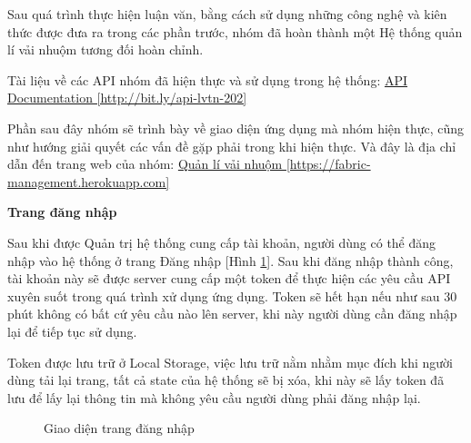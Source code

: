 Sau quá trình thực hiện luận văn, bằng cách sử dụng những công nghệ và kiên thức được đưa ra trong các phần trước, nhóm đã hoàn thành một Hệ thống quản lí vải nhuộm tương đối hoàn chỉnh.\par

Tài liệu về các API nhóm đã hiện thực và sử dụng trong hệ thống: \href{http://bit.ly/api-lvtn-202}{API Documentation [http://bit.ly/api-lvtn-202]}

Phần sau đây nhóm sẽ trình bày về giao diện ứng dụng mà nhóm hiện thực, cũng như hướng giải quyết các vấn đề gặp phải trong khi hiện thực. Và đây là địa chỉ dẫn đến trang web của nhóm: \href{https://fabric-management.herokuapp.com}{Quản lí vải nhuộm [https://fabric-management.herokuapp.com]}

\textbf{Trang đăng nhập}

Sau khi được Quản trị hệ thống cung cấp tài khoản, người dùng có thể đăng nhập vào hệ thống ở trang Đăng nhập [Hình \ref{result_dang_nhap}]. Sau khi đăng nhập thành công, tài khoản này sẽ được server cung cấp một token để thực hiện các yêu cầu API xuyên suốt trong quá trình xử dụng ứng dụng. Token sẽ hết hạn nếu như sau 30 phút không có bất cứ yêu cầu nào lên server, khi này người dùng cần đăng nhập lại để tiếp tục sử dụng.\par
Token được lưu trữ ở Local Storage, việc lưu trữ nằm nhằm mục đích khi người dùng tải lại trang, tất cả state của hệ thống sẽ bị xóa, khi này sẽ lấy token đã lưu để lấy lại thông tin mà không yêu cầu người dùng phải đăng nhập lại.
\begin{figure}[H]
    \begin{center}
        \caption{Giao diện trang đăng nhập}
        \label{result_dang_nhap}
    \end{center}
\end{figure}

